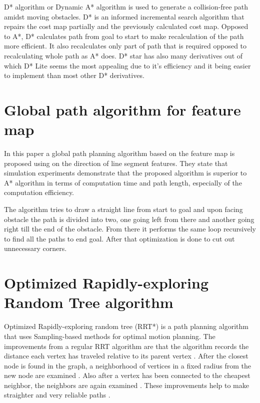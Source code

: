\documentclass[12pt, a4paper, onecolumn]{article}
\begin{document}
D* algorithm or Dynamic A* algorithm is used to generate a collision-free path amidst moving obstacles.
D* is an informed incremental search algorithm that repairs the cost map partially and the previously calculated cost map. \cite{Karur21}
Opposed to A*, D* calculates path from goal to start to make recalculation of the path more efficient. \cite{DstarWiki}
It also recalculates only part of path that is required opposed to recalculating whole path as A* does.
D* star has also many derivatives out of which D* Lite seems the most appealing due to it's efficiency and it being easier to implement than most other D* derivatives.

\section{Global path algorithm for feature map}

In this \cite{Ren22} paper a global path planning algorithm based on the feature map is proposed using on the direction of line segment features. They state that simulation experiments demonstrate
that the proposed algorithm is superior to A* algorithm in terms of computation time
and path length, especially of the computation efficiency. \cite{Ren22}

The algorithm tries to draw a straight line from start to goal and upon facing obstacle the path is divided into two, one going left from there and another going right till the end of the obstacle.
From there it performs the same loop recursively to find all the paths to end goal.
After that optimization is done to cut out unnecessary corners. \cite{Ren22} %

\section{Optimized Rapidly-exploring Random Tree algorithm}

Optimized Rapidly-exploring random tree (RRT*) \cite{Karaman11} is a path planning algorithm that uses Sampling-based methods for optimal motion planning. 
The improvements from a regular RRT algorithm are that the algorithm records the distance each vertex has traveled relative to its parent vertex \cite{RRT19}.
After the closest node is found in the graph, a neighborhood of vertices in a fixed radius from the new node are examined \cite{RRT19}.
Also after a vertex has been connected to the cheapest neighbor, the neighbors are again examined \cite{RRT19}.
These improvements help to make straighter and very reliable paths .
\end{document}
